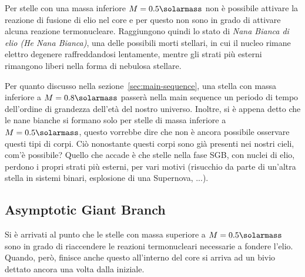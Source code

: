 Per stelle con una massa inferiore $M = 0.5\si{\solarmass}$ non è possibile attivare la reazione di fusione di elio nel core e per questo non sono in grado di attivare alcuna reazione termonucleare. Raggiungono quindi lo stato di \textit{Nana Bianca di elio (He Nana Bianca)}, una delle possibili morti stellari, in cui il nucleo rimane elettro degenere raffreddandosi lentamente, mentre gli strati più esterni rimangono liberi nella forma di nebulosa stellare.

Per quanto discusso nella sezione~\ref{sec:main-sequence}, una stella con massa inferiore a $M = 0.8 \si{\solarmass}$ passerà nella main sequence un periodo di tempo dell'ordine di grandezza dell'età del nostro universo. Inoltre, si è appena detto che le nane bianche si formano solo per stelle di massa inferiore a $M = 0.5 \si{\solarmass}$, questo vorrebbe dire che non è ancora possibile osservare questi tipi di corpi. Ciò nonostante questi corpi sono già presenti nei nostri cieli, com'è possibile? Quello che accade è che stelle nella fase SGB, con nuclei di elio, perdono i propri strati più esterni, per vari motivi (risucchio da parte di un'altra stella in sistemi binari, esplosione di una Supernova, ...).
\subsection{Asymptotic Giant Branch}\label{sec:asymptotic-giant-branch}

Si è arrivati al punto che le stelle con massa superiore a $M = 0.5 \si{\solarmass}$ sono in grado di riaccendere le reazioni termonucleari necessarie a fondere l'elio. Quando, però, finisce anche questo all'interno del core si arriva ad un bivio dettato ancora una volta dalla iniziale. 

